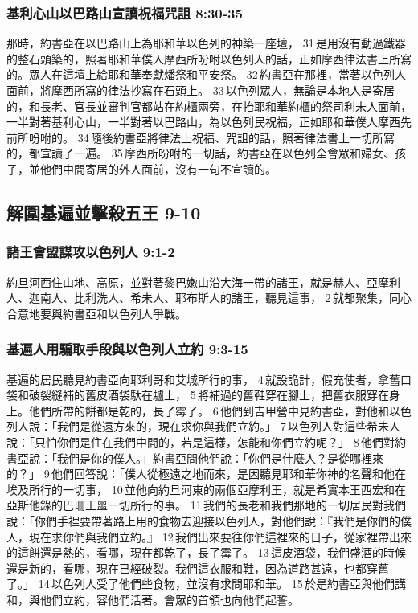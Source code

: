 \subsubsection{基利心山以巴路山宣讀祝福咒詛 8:30-35}
那時，約書亞在以巴路山上為耶和華以色列的神築一座壇， 31 是用沒有動過鐵器的整石頭築的，照著耶和華僕人摩西所吩咐以色列人的話，正如摩西律法書上所寫的。眾人在這壇上給耶和華奉獻燔祭和平安祭。 32 約書亞在那裡，當著以色列人面前，將摩西所寫的律法抄寫在石頭上。 33 以色列眾人，無論是本地人是寄居的，和長老、官長並審判官都站在約櫃兩旁，在抬耶和華約櫃的祭司利未人面前，一半對著基利心山，一半對著以巴路山，為以色列民祝福，正如耶和華僕人摩西先前所吩咐的。 34 隨後約書亞將律法上祝福、咒詛的話，照著律法書上一切所寫的，都宣讀了一遍。 35 摩西所吩咐的一切話，約書亞在以色列全會眾和婦女、孩子，並他們中間寄居的外人面前，沒有一句不宣讀的。



\subsection{解圍基遍並擊殺五王 9-10 }

\subsubsection{諸王會盟謀攻以色列人 9:1-2 }
約旦河西住山地、高原，並對著黎巴嫩山沿大海一帶的諸王，就是赫人、亞摩利人、迦南人、比利洗人、希未人、耶布斯人的諸王，聽見這事， 2 就都聚集，同心合意地要與約書亞和以色列人爭戰。

\subsubsection{基遍人用騙取手段與以色列人立約 9:3-15}
基遍的居民聽見約書亞向耶利哥和艾城所行的事， 4 就設詭計，假充使者，拿舊口袋和破裂縫補的舊皮酒袋馱在驢上， 5 將補過的舊鞋穿在腳上，把舊衣服穿在身上。他們所帶的餅都是乾的，長了霉了。 6 他們到吉甲營中見約書亞，對他和以色列人說：「我們是從遠方來的，現在求你與我們立約。」 7 以色列人對這些希未人說：「只怕你們是住在我們中間的，若是這樣，怎能和你們立約呢？」 8 他們對約書亞說：「我們是你的僕人。」約書亞問他們說：「你們是什麼人？是從哪裡來的？」 9 他們回答說：「僕人從極遠之地而來，是因聽見耶和華你神的名聲和他在埃及所行的一切事， 10 並他向約旦河東的兩個亞摩利王，就是希實本王西宏和在亞斯他錄的巴珊王噩一切所行的事。 11 我們的長老和我們那地的一切居民對我們說：「你們手裡要帶著路上用的食物去迎接以色列人，對他們說：『我們是你們的僕人，現在求你們與我們立約。』 12 我們出來要往你們這裡來的日子，從家裡帶出來的這餅還是熱的，看哪，現在都乾了，長了霉了。 13 這皮酒袋，我們盛酒的時候還是新的，看哪，現在已經破裂。我們這衣服和鞋，因為道路甚遠，也都穿舊了。」 14 以色列人受了他們些食物，並沒有求問耶和華。 15 於是約書亞與他們講和，與他們立約，容他們活著。會眾的首領也向他們起誓。

